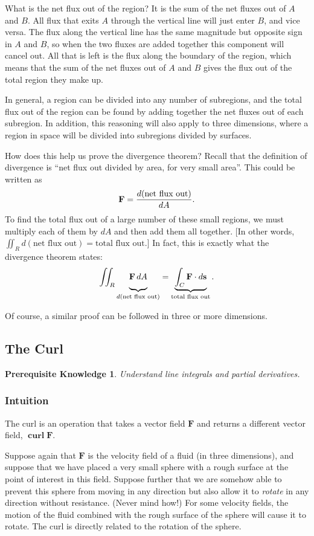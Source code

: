 \documentclass{myarticle}
\let\div\relax %
\DeclareMathOperator{\div}{div}
\DeclareMathOperator{\curl}{\mathbf{curl}}
\renewcommand{\vec}[1]{\mathbf{#1}}
\theoremstyle{nospace}
\newtheorem*{oldprereq}{Prerequisite Knowledge}
\newenvironment{prereq}
{\begin{mdframed}\begin{oldprereq}}
    {\end{oldprereq}\end{mdframed}}
\newtheorem{old series theorem}{Theorem}
\newenvironment{series theorem}
{\begin{mdframed}\begin{old series theorem}}
    {\end{old series theorem}\end{mdframed}}
\begin{document}
What is the net flux out of the region? It is the sum of the net
fluxes out of $A$ and $B$. All flux that exits $A$ through the
vertical line will just enter $B$, and vice versa. The flux along the
vertical line has the same magnitude but opposite sign in $A$ and $B$,
so when the two fluxes are added together this component will cancel
out. All that is left is the flux along the boundary of the region,
which means that the sum of the net fluxes out of $A$ and $B$ gives
the flux out of the total region they make up.

In general, a region can be divided into any number of subregions, and
the total flux out of the region can be found by adding together the
net fluxes out of each subregion. In addition, this reasoning will
also apply to three dimensions, where a region in space will be
divided into subregions divided by surfaces.

How does this help us prove the divergence theorem? Recall that the
definition of divergence is ``net flux out divided by area, for very
small area''. This could be written as
\[
  \div \vec{F} = \frac{d(\text{net flux out})}{dA}.
\]
To find the total flux out of a large number of these small regions,
we must multiply each of them by $dA$ and then add them all together.
[In other words,
$\iint_R d(\text{net flux out}) = \text{total flux out}$.] In fact,
this is exactly what the divergence theorem states:
\[
  \iint_R \underbrace
  {\div \vec{F} \,dA\vphantom{\int}}
  _{d(\text{net flux out})}
  = \underbrace{\int_C \vec{F} \cdot d\vec{s}}_\text{total flux out}.
\]

Of course, a similar proof can be followed in three or more
dimensions.

\subsection{The Curl}
\label{sec:curl}

\begin{prereq}
  Understand line integrals and partial derivatives.
\end{prereq}

\subsubsection{Intuition}
\label{sec:curl intuition}

The curl is an operation that takes a vector field $\vec{F}$ and
returns a different vector field, $\curl \vec{F}$.

Suppose again that $\vec{F}$ is the velocity field of a fluid (in
three dimensions), and suppose that we have placed a very small sphere
with a rough surface at the point of interest in this field. Suppose
further that we are somehow able to prevent this sphere from moving in
any direction but also allow it to \textit{rotate} in any direction
without resistance. (Never mind how!) For some velocity fields, the
motion of the fluid combined with the rough surface of the sphere will
cause it to rotate. The curl is directly related to the rotation of
the sphere.
\end{document}
